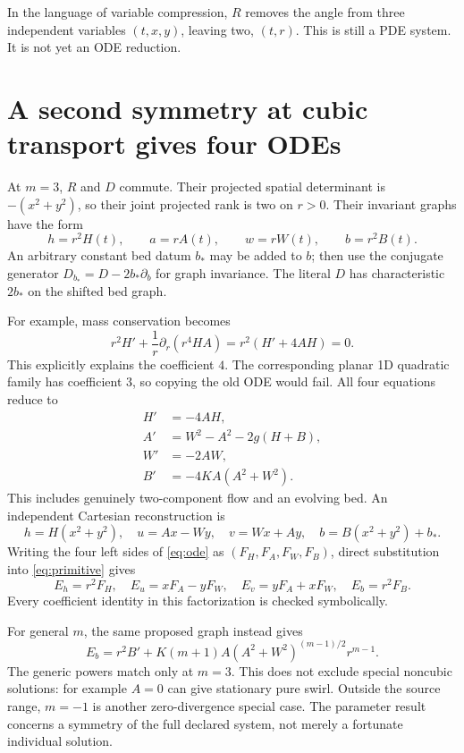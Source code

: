 \documentclass[11pt]{article}
\begin{document}
In the language of variable compression, $R$ removes the angle from
three independent variables $(t,x,y)$, leaving two, $(t,r)$.
This is still a PDE system. It is not yet an ODE reduction.

\section{A second symmetry at cubic transport gives four ODEs}
At $m=3$, $R$ and $D$ commute. Their projected spatial determinant is
$-(x^2+y^2)$, so their joint projected rank is two on $r>0$.
Their invariant graphs have the form
\begin{equation}\label{eq:cubic-ansatz}
 h=r^2H(t),\qquad a=rA(t),\qquad w=rW(t),\qquad b=r^2B(t).
\end{equation}
An arbitrary constant bed datum $b_*$ may be added to $b$; then use the
conjugate generator $D_{b_*}=D-2b_*\partial_b$ for graph invariance.
The literal $D$ has characteristic $2b_*$ on the shifted bed graph.

For example, mass conservation becomes
\[
 r^2H'+\frac1r\partial_r(r^4HA)=r^2(H'+4AH)=0.
\]
This explicitly explains the coefficient $4$. The corresponding planar
1D quadratic family has coefficient $3$, so copying the old ODE would fail.
All four equations reduce to
\begin{equation}\label{eq:ode}
\boxed{\begin{aligned}
 H'&=-4AH,\\
 A'&=W^2-A^2-2g(H+B),\\
 W'&=-2AW,\\
 B'&=-4KA(A^2+W^2).
\end{aligned}}
\end{equation}
This includes genuinely two-component flow and an evolving bed.
An independent Cartesian reconstruction is
\[
 h=H(x^2+y^2),\quad u=Ax-Wy,\quad v=Wx+Ay,\quad
 b=B(x^2+y^2)+b_*.
\]
Writing the four left sides of \eqref{eq:ode} as
$(F_H,F_A,F_W,F_B)$, direct substitution into \eqref{eq:primitive} gives
\begin{equation}\label{eq:factorization}
 E_h=r^2F_H,\quad E_u=xF_A-yF_W,\quad
 E_v=yF_A+xF_W,\quad E_b=r^2F_B.
\end{equation}
Every coefficient identity in this factorization is checked symbolically.

For general $m$, the same proposed graph instead gives
\[
 E_b=r^2B'+K(m+1)A(A^2+W^2)^{(m-1)/2}r^{m-1}.
\]
The generic powers match only at $m=3$. This does not exclude special
noncubic solutions: for example $A=0$ can give stationary pure swirl.
Outside the source range, $m=-1$ is another zero-divergence special case.
The parameter result concerns a symmetry of the full declared system,
not merely a fortunate individual solution.
\end{document}
